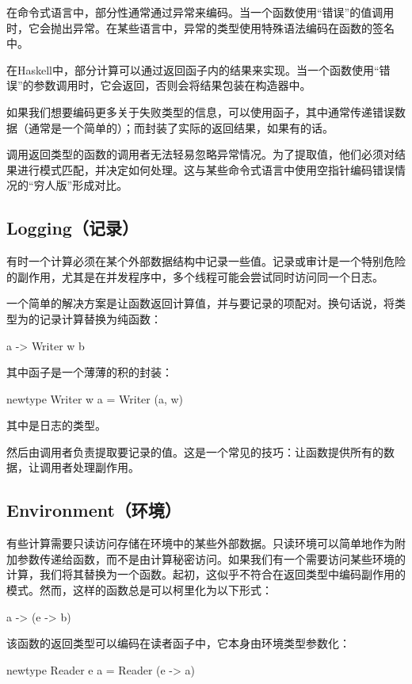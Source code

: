 \documentclass[DaoFP]{subfiles}
\begin{document}
    在命令式语言中，部分性通常通过异常来编码。当一个函数使用“错误”的值调用时，它会抛出异常。在某些语言中，异常的类型使用特殊语法编码在函数的签名中。

    在Haskell中，部分计算可以通过返回函子内的结果来实现。当一个函数使用“错误”的参数调用时，它会返回，否则会将结果包装在构造器中。

    如果我们想要编码更多关于失败类型的信息，可以使用函子，其中通常传递错误数据（通常是一个简单的）；而封装了实际的返回结果，如果有的话。

    调用返回类型的函数的调用者无法轻易忽略异常情况。为了提取值，他们必须对结果进行模式匹配，并决定如何处理。这与某些命令式语言中使用空指针编码错误情况的“穷人版”形成对比。

    \subsection{Logging（记录）}

    有时一个计算必须在某个外部数据结构中记录一些值。记录或审计是一个特别危险的副作用，尤其是在并发程序中，多个线程可能会尝试同时访问同一个日志。

    一个简单的解决方案是让函数返回计算值，并与要记录的项配对。换句话说，将类型为的记录计算替换为纯函数：
    \begin{haskell}
        a -> Writer w b
    \end{haskell}
    其中函子是一个薄薄的积的封装：
    \begin{haskell}
        newtype Writer w a = Writer (a, w)
    \end{haskell}
    其中是日志的类型。

    然后由调用者负责提取要记录的值。这是一个常见的技巧：让函数提供所有的数据，让调用者处理副作用。

    \subsection{Environment（环境）}

    有些计算需要只读访问存储在环境中的某些外部数据。只读环境可以简单地作为附加参数传递给函数，而不是由计算秘密访问。如果我们有一个需要访问某些环境的计算，我们将其替换为一个函数。起初，这似乎不符合在返回类型中编码副作用的模式。然而，这样的函数总是可以柯里化为以下形式：
    \begin{haskell}
        a -> (e -> b)
    \end{haskell}
    该函数的返回类型可以编码在读者函子中，它本身由环境类型参数化：
    \begin{haskell}
        newtype Reader e a = Reader (e -> a)
    \end{haskell}
\end{document}
